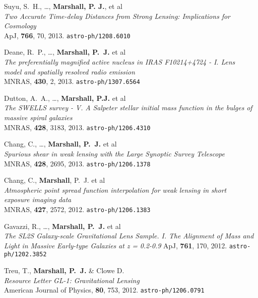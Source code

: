 \begin{revnumerate}
  \item{Suyu, S.~H., \ldots, \textbf{Marshall, P. J.}, et al\\
  \textit{Two Accurate Time-delay Distances from Strong Lensing: Implications for Cosmology}\\
  ApJ, \textbf{766}, 70, 2013.
  \texttt{astro-ph/1208.6010}
  }

  \item{{Deane}, R.~P., \ldots, \textbf{Marshall, P.~J.} et al\\
  \textit{The preferentially magnified active nucleus in IRAS F10214+4724 - I. Lens model and spatially resolved radio emission}\\
  MNRAS, \textbf{430}, 2, 2013.
  \texttt{astro-ph/1307.6564}
  }

  \item{Dutton, A.~A., \ldots, \textbf{Marshall, P.J.} et al\\
  \textit{The SWELLS survey - V. A Salpeter stellar initial mass function in the bulges of massive spiral galaxies}\\
  MNRAS, \textbf{428}, 3183, 2013.
  \texttt{astro-ph/1206.4310}
  }

  \item{Chang, C., \ldots, \textbf{Marshall, P.~J.} et al\\
  \textit{Spurious shear in weak lensing with the Large Synoptic Survey Telescope}\\
  MNRAS, \textbf{428}, 2695, 2013.
  \texttt{astro-ph/1206.1378}
  }

  \item{{Chang}, C., \textbf{Marshall}, P.~J. et al\\
  \textit{Atmospheric point spread function interpolation for weak lensing in short exposure imaging data}\\
  MNRAS, \textbf{427}, 2572, 2012.
  \texttt{astro-ph/1206.1383}
  }

  \item{{Gavazzi}, R., \ldots, \textbf{Marshall, P.~J.} et al\\
  \textit{The SL2S Galaxy-scale Gravitational Lens Sample. I. The Alignment of Mass and Light in Massive Early-type Galaxies at z = 0.2-0.9}
  ApJ, \textbf{761}, 170, 2012.
  \texttt{astro-ph/1202.3852}
  }


  \item{{Treu}, T., \textbf{{Marshall}, P.~J.} \& Clowe D.\\
  \textit{Resource Letter GL-1: Gravitational Lensing}\\
  American Journal of Physics, \textbf{80}, 753, 2012.
  \texttt{astro-ph/1206.0791}
  }


\end{revnumerate}
